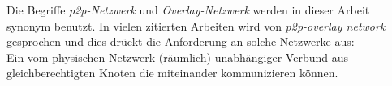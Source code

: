 Die Begriffe \emph{p2p-Netzwerk} und \emph{Overlay-Netzwerk} werden in dieser Arbeit synonym benutzt. In vielen zitierten Arbeiten wird von \emph{p2p-overlay network} gesprochen und dies drückt die Anforderung an solche Netzwerke aus:\\
Ein vom physischen Netzwerk (räumlich) unabhängiger Verbund aus gleichberechtigten Knoten die miteinander kommunizieren können.










